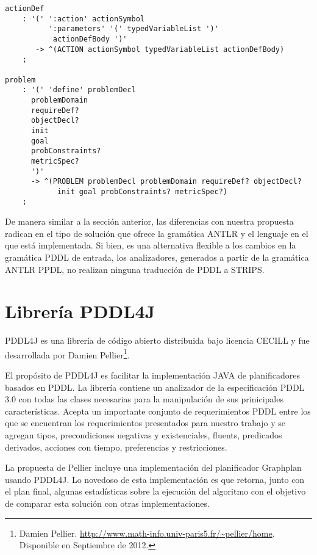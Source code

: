 \begin{itemize}
\begin{ejemplo}
\begin{verbatim}
actionDef
	: '(' ':action' actionSymbol
	      ':parameters' '(' typedVariableList ')'
           actionDefBody ')'
       -> ^(ACTION actionSymbol typedVariableList actionDefBody)
    ;
    
problem
	: '(' 'define' problemDecl
	  problemDomain
      requireDef?
      objectDecl?
      init
      goal
      probConstraints?
      metricSpec?
      ')'
      -> ^(PROBLEM problemDecl problemDomain requireDef? objectDecl?
      		init goal probConstraints? metricSpec?)
    ;

 \end{verbatim}
\end{ejemplo}

\end{itemize}	


De manera similar a la secci\'on anterior, las diferencias con
nuestra propuesta radican en el tipo de soluci\'on que ofrece la
gram\'atica ANTLR y el lenguaje en el que est\'a implementada. 
Si bien, es una alternativa flexible a
los cambios en la gram\'atica PDDL de entrada, los analizadores,
generados a partir de la gram\'atica ANTLR PPDL, no
realizan ninguna traducci\'on de PDDL a STRIPS.



\section{Librer\'ia PDDL4J} \label{cap4:sec3}

PDDL4J es una librer\'ia de c\'odigo abierto 
distribuida bajo licencia CECILL \cite{gbraun:cecill} y fue de\-sa\-rro\-lla\-da por 
Damien Pellier\footnote{Damien Pellier. \url{http://www.math-info.univ-paris5.fr/~pellier/home}. Disponible
en Septiembre de 2012.}. 

El prop\'osito de PDDL4J es facilitar la implementaci\'on JAVA
de planificadores basados en PDDL. La librer\'ia contiene un
analizador de la especificaci\'on PDDL 3.0 con todas las clases
necesarias para la manipulaci\'on de sus prinicipales caracter\'isticas. Acepta un
importante conjunto de requerimientos PDDL entre los que se
encuentran los requerimientos presentados para nuestro trabajo
y se agregan tipos, precondiciones negativas y existenciales,
fluents, predicados derivados, acciones con tiempo,
preferencias y restricciones.

La propuesta de Pellier incluye una implementaci\'on
del planificador Graphplan usando PDDL4J. Lo novedoso de esta implementaci\'on
es que retorna, junto con el plan final, algunas estad\'isticas 
sobre la ejecuci\'on del algoritmo con el objetivo de comparar esta soluci\'on con
otras implementaciones. 

